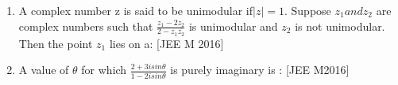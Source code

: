 \documentclass[journal,12pt,twocolumn,article]{IEEEtran}
\theoremstyle{remark}
\begin{document}
\begin{enumerate}[start = 14]
\item A complex number z is said to be unimodular if$|z|=1$. Suppose $z_1 and z_2$ are complex numbers such that $\frac{z_1 -2z_2}{2-z_1\overline{z_2}}$ is unimodular and $z_2$ is not unimodular. Then the point $z_1$ lies on a:                                
\hfill{[JEE M 2016]}                               

\begin{enumerate}                                  
\end{enumerate}

\item A value of $\theta$ for which $\frac{2+3isin\theta}{1-2isin\theta}$ is purely imaginary is :      
\hfill{[JEE M2016]}

\begin{enumerate}
\end{enumerate}                                     


\end{enumerate}
\end{document}
